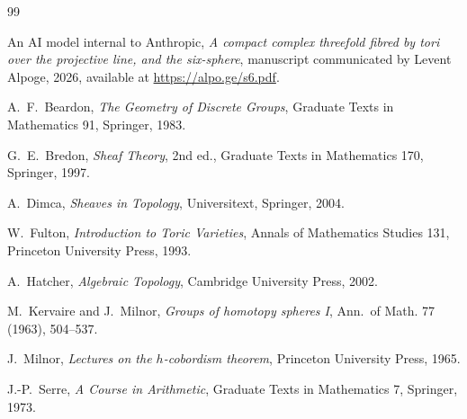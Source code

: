 \begin{thebibliography}{99}

An AI model internal to Anthropic,
\emph{A compact complex threefold fibred by tori over the projective line, and the six-sphere},
manuscript communicated by Levent Alpoge, 2026,
available at \url{https://alpo.ge/s6.pdf}.

A.~F.~Beardon,
\emph{The Geometry of Discrete Groups},
Graduate Texts in Mathematics 91, Springer, 1983.

G.~E.~Bredon,
\emph{Sheaf Theory}, 2nd ed.,
Graduate Texts in Mathematics 170, Springer, 1997.

A.~Dimca,
\emph{Sheaves in Topology},
Universitext, Springer, 2004.

W.~Fulton,
\emph{Introduction to Toric Varieties},
Annals of Mathematics Studies 131, Princeton University Press, 1993.

A.~Hatcher,
\emph{Algebraic Topology},
Cambridge University Press, 2002.

M.~Kervaire and J.~Milnor,
\emph{Groups of homotopy spheres I},
Ann.\ of Math. 77 (1963), 504--537.

J.~Milnor,
\emph{Lectures on the $h$-cobordism theorem},
Princeton University Press, 1965.

J.-P.~Serre,
\emph{A Course in Arithmetic},
Graduate Texts in Mathematics 7, Springer, 1973.

\end{thebibliography}

